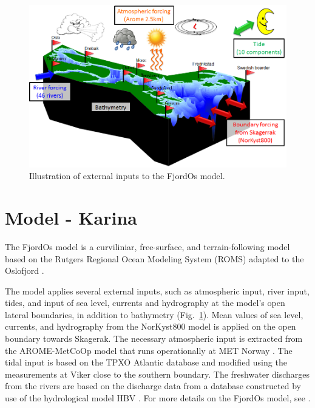 \documentclass[12pt,a4paper,english]{article}
\begin{document}
\begin{figure}[t]
\centerline{
\includegraphics*[width=\textwidth]{Figurer/oppbygging}
}
\caption{\small
Illustration of external inputs to the FjordOs model.
}
\label{fig:oppbygging}
\end{figure}

\clearpage

\section{Model - Karina}
The FjordOs model is a curviliniar, free-surface, and terrain-following model based on the Rutgers Regional Ocean Modeling System (ROMS) \citep{haidv:etal:2008,shche:mcwil:2003,shche:mcwil:2005,shche:mcwil:2009} adapted to the Oslofjord \citep{roed:etal:2016}. 

The model applies several external inputs, such as atmospheric input, river input, tides, and input of sea level, currents and hydrography at the model's open lateral boundaries, in addition to bathymetry (Fig.~\ref{fig:oppbygging}). Mean values of sea level, currents, and hydrography from the NorKyst800 model \citep{albre:etal:2011} is applied on the open boundary towards Skagerak. The necessary atmospheric input is extracted from the AROME-MetCoOp model that runs operationally at MET Norway \citep{mulle:etal:2015}. The tidal input is based on the TPXO Atlantic database \citep{egber:erofe:2002} and modified using the measurements at Viker close to the southern boundary. The freshwater discharges from the rivers are based on the discharge data from a database constructed by use of the hydrological model HBV \citep{beldr:etal:2003}. For more details on the FjordOs model, see \cite{roed:etal:2016}.
\end{document}
